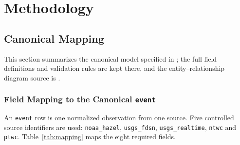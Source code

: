 \documentclass[a4paper,11pt,oneside]{book}
\begin{document}
\chapter{Methodology}
\label{ch:methodology}

\section{Canonical Mapping}
\label{sec:mapping}

This section summarizes the canonical model specified in ; the full field definitions and validation rules are kept there, and the entity--relationship diagram source is .

\subsection{Field Mapping to the Canonical \texttt{event}}
An \texttt{event} row is one normalized observation from one source.
Five controlled source identifiers are used: \texttt{noaa\_hazel}, \texttt{usgs\_fdsn}, \texttt{usgs\_realtime}, \texttt{ntwc} and \texttt{ptwc}.
Table~\ref{tab:mapping} maps the eight required fields.
\end{document}
